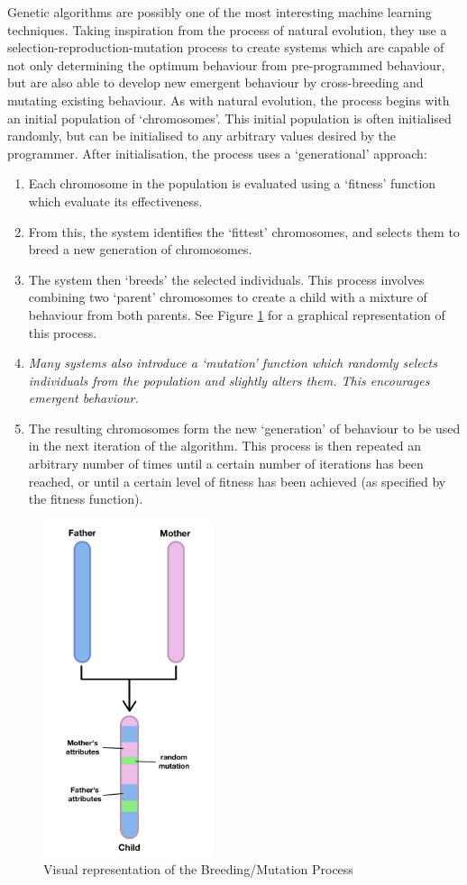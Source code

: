 \documentclass[a4paper,oneside]{report}
\begin{document}
Genetic algorithms are possibly one of the most interesting machine learning techniques. Taking inspiration from the process of natural evolution, they use a selection-reproduction-mutation process to create systems which are capable of not only determining the optimum behaviour from pre-programmed behaviour, but are also able to develop new emergent behaviour by cross-breeding and mutating existing behaviour. As with natural evolution, the process begins with an initial population of `chromosomes'. This initial population is often initialised randomly, but can be initialised to any arbitrary values desired by the programmer. After initialisation, the process uses a `generational' approach:

\begin{enumerate}
	\item Each chromosome in the population is evaluated using a `fitness' function which evaluate its effectiveness.
	\item From this, the system identifies the `fittest' chromosomes, and selects them to breed a new generation of chromosomes.
	\item The system then `breeds' the selected individuals. This process involves combining two `parent' chromosomes to create a child with a mixture of behaviour from both parents. See Figure \ref{fig:Breeding} for a graphical representation of this process.
	\item \emph{Many systems also introduce a `mutation' function which randomly selects individuals from the population and slightly alters them. This encourages emergent behaviour.}
	\item The resulting chromosomes form the new `generation' of behaviour to be used in the next iteration of the algorithm. This process is then repeated an arbitrary number of times until a certain number of iterations has been reached, or until a certain level of fitness has been achieved (as specified by the fitness function).
\end{enumerate}
  
\begin{figure}[h!]
	\centering
		\includegraphics[width=50mm]{sources/images/Evolution}
    	\caption{Visual representation of the Breeding/Mutation Process}
    	\label{fig:Breeding}
\end{figure}
\end{document}
